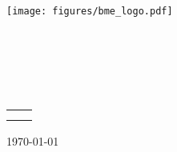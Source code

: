 \hypersetup{pageanchor=false}
\begin{titlepage}
\begin{center}
\texttt{[image: figures/bme\_logo.pdf]}\\
\vspace{0.3cm}
\textbf{\bme}\\
\textmd{\vik}\\
\textmd{\viktanszek}\\[5cm]

\vspace{0.4cm}
{\huge \bfseries \vikcim}\\[0.8cm]
\vspace{0.5cm}
\textsc{\Large \vikdoktipus}\\[4cm]

{
	\renewcommand{\arraystretch}{0.85}
	\begin{tabular}{cc}
	 \makebox[7cm]{\emph{\keszitette}} & \makebox[7cm]{\emph{\konzulens}} \\ \noalign{\smallskip}
	 \makebox[7cm]{\szerzo} & \makebox[7cm]{\vikkonzulensA} \\
	\end{tabular}
}

\vfill
{\large \today}
\end{center}
\end{titlepage}
\hypersetup{pageanchor=false}

